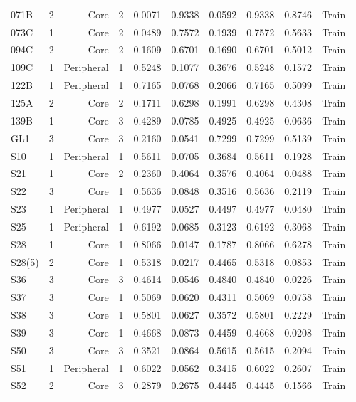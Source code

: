 {\begin{longtable}{lrrrrrrrrr}
  071B & 2 & Core & 2 & 0.0071 & 0.9338 & 0.0592 & 0.9338 & 0.8746 & Train \\
  073C & 1 & Core & 2 & 0.0489 & 0.7572 & 0.1939 & 0.7572 & 0.5633 & Train \\
  094C & 2 & Core & 2 & 0.1609 & 0.6701 & 0.1690 & 0.6701 & 0.5012 & Train \\
  109C & 1 & Peripheral & 1 & 0.5248 & 0.1077 & 0.3676 & 0.5248 & 0.1572 & Train \\
  122B & 1 & Peripheral & 1 & 0.7165 & 0.0768 & 0.2066 & 0.7165 & 0.5099 & Train \\
  125A & 2 & Core & 2 & 0.1711 & 0.6298 & 0.1991 & 0.6298 & 0.4308 & Train \\
  139B & 1 & Core & 3 & 0.4289 & 0.0785 & 0.4925 & 0.4925 & 0.0636 & Train \\
  GL1 & 3 & Core & 3 & 0.2160 & 0.0541 & 0.7299 & 0.7299 & 0.5139 & Train \\
  S10 & 1 & Peripheral & 1 & 0.5611 & 0.0705 & 0.3684 & 0.5611 & 0.1928 & Train \\
  S21 & 1 & Core & 2 & 0.2360 & 0.4064 & 0.3576 & 0.4064 & 0.0488 & Train \\
  S22 & 3 & Core & 1 & 0.5636 & 0.0848 & 0.3516 & 0.5636 & 0.2119 & Train \\
  S23 & 1 & Peripheral & 1 & 0.4977 & 0.0527 & 0.4497 & 0.4977 & 0.0480 & Train \\
  S25 & 1 & Peripheral & 1 & 0.6192 & 0.0685 & 0.3123 & 0.6192 & 0.3068 & Train \\
  S28 & 1 & Core & 1 & 0.8066 & 0.0147 & 0.1787 & 0.8066 & 0.6278 & Train \\
  S28(5) & 2 & Core & 1 & 0.5318 & 0.0217 & 0.4465 & 0.5318 & 0.0853 & Train \\
  S36 & 3 & Core & 3 & 0.4614 & 0.0546 & 0.4840 & 0.4840 & 0.0226 & Train \\
  S37 & 3 & Core & 1 & 0.5069 & 0.0620 & 0.4311 & 0.5069 & 0.0758 & Train \\
  S38 & 3 & Core & 1 & 0.5801 & 0.0627 & 0.3572 & 0.5801 & 0.2229 & Train \\
  S39 & 3 & Core & 1 & 0.4668 & 0.0873 & 0.4459 & 0.4668 & 0.0208 & Train \\
  S50 & 3 & Core & 3 & 0.3521 & 0.0864 & 0.5615 & 0.5615 & 0.2094 & Train \\
  S51 & 1 & Peripheral & 1 & 0.6022 & 0.0562 & 0.3415 & 0.6022 & 0.2607 & Train \\
  S52 & 2 & Core & 3 & 0.2879 & 0.2675 & 0.4445 & 0.4445 & 0.1566 & Train \\

\end{longtable}}

